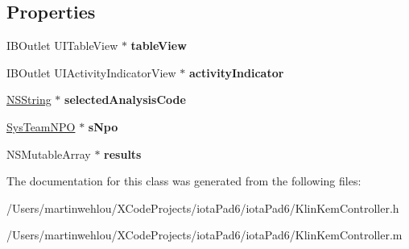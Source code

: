 \subsection*{Properties}
\begin{DoxyCompactItemize}
\item 
\hypertarget{interface_klin_kem_controller_a9bfdca49a31ef05970f6cd3a7a6585f3}{
IBOutlet UITableView $\ast$ {\bfseries tableView}}
\label{interface_klin_kem_controller_a9bfdca49a31ef05970f6cd3a7a6585f3}

\item 
\hypertarget{interface_klin_kem_controller_a398b45d1b1f68d2e11e99575f051b6bb}{
IBOutlet UIActivityIndicatorView $\ast$ {\bfseries activityIndicator}}
\label{interface_klin_kem_controller_a398b45d1b1f68d2e11e99575f051b6bb}

\item 
\hypertarget{interface_klin_kem_controller_a79726f828d8dcbe4baa6693829a11dec}{
\hyperlink{class_n_s_string}{NSString} $\ast$ {\bfseries selectedAnalysisCode}}
\label{interface_klin_kem_controller_a79726f828d8dcbe4baa6693829a11dec}

\item 
\hypertarget{interface_klin_kem_controller_ae83287c0d15311b8998d031f66d06c27}{
\hyperlink{interface_sys_team_n_p_o}{SysTeamNPO} $\ast$ {\bfseries sNpo}}
\label{interface_klin_kem_controller_ae83287c0d15311b8998d031f66d06c27}

\item 
\hypertarget{interface_klin_kem_controller_a1353a05d67336e4feba88903a9868b4a}{
NSMutableArray $\ast$ {\bfseries results}}
\label{interface_klin_kem_controller_a1353a05d67336e4feba88903a9868b4a}

\end{DoxyCompactItemize}


The documentation for this class was generated from the following files:\begin{DoxyCompactItemize}
\item 
/Users/martinwehlou/XCodeProjects/iotaPad6/iotaPad6/KlinKemController.h\item 
/Users/martinwehlou/XCodeProjects/iotaPad6/iotaPad6/KlinKemController.m\end{DoxyCompactItemize}
